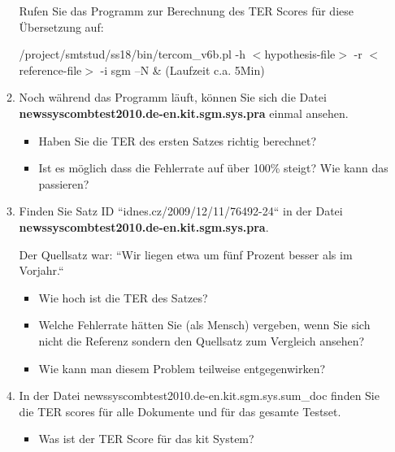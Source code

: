 \documentclass[12pt,fleqn]{article}
\begin{document}
\begin{enumerate}
\begin{enumerate}
\vspace{0.5cm} 
Rufen Sie das Programm zur Berechnung des TER Scores für diese Übersetzung auf:

/project/smtstud/ss18/bin/tercom\_v6b.pl -h $<$hypothesis-file$>$ -r $<$reference-file$>$ -i sgm –N \&
(Laufzeit c.a. 5Min)

\vspace{0.5cm} 
\item Noch während das Programm läuft, können Sie sich die Datei \textbf{newssyscombtest2010.de-en.kit.sgm.sys.pra} einmal ansehen.

\vspace{0.5cm} 
\begin{itemize} 
 \item Haben Sie die TER des ersten Satzes richtig berechnet?
\item Ist es möglich dass die Fehlerrate auf über 100\% steigt? Wie kann das passieren?
\end{itemize} 

\vspace{0.5cm} 
\item Finden Sie Satz ID ``idnes.cz/2009/12/11/76492-24“ in der Datei \textbf{newssyscombtest2010.de-en.kit.sgm.sys.pra}. 

Der Quellsatz war: ``Wir liegen etwa um fünf Prozent besser als im Vorjahr.“

\vspace{0.5cm} 
\begin{itemize} 
\item Wie hoch ist die TER des Satzes?
\item Welche Fehlerrate hätten Sie (als Mensch) vergeben, wenn Sie sich nicht die Referenz sondern den Quellsatz zum Vergleich ansehen?
\item Wie kann man diesem Problem teilweise entgegenwirken?
\end{itemize} 

\vspace{0.5cm} 
\item In der Datei newssyscombtest2010.de-en.kit.sgm.sys.sum\_doc finden Sie die TER scores für alle Dokumente und für das gesamte Testset.

\vspace{0.5cm} 
\begin{itemize} 
\item Was ist der TER Score für das kit System?
\end{itemize} 
\end{enumerate} 


\end{enumerate}
\end{document}
